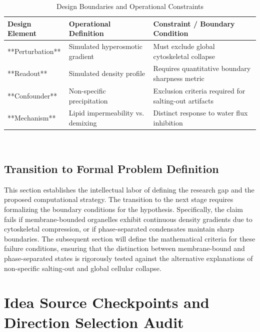 \documentclass[conference]{IEEEtran}
\begin{document}
\begin{table}[htbp]
\centering
\footnotesize
\setlength{\tabcolsep}{3pt}
\renewcommand{\arraystretch}{1.12}
\caption{Design Boundaries and Operational Constraints}
\label{tab:research-questions-and-contributions-rqc-3}
\begin{tabular}{|p{}|p{}|p{}|}
\hline
Design Element & Operational Definition & Constraint / Boundary Condition \\\hline
**Perturbation** & Simulated hyperosmotic gradient & Must exclude global cytoskeletal collapse \\\hline
**Readout** & Simulated density profile & Requires quantitative boundary sharpness metric \\\hline
**Confounder** & Non-specific precipitation & Exclusion criteria required for salting-out artifacts \\\hline
**Mechanism** & Lipid impermeability vs. demixing & Distinct response to water flux inhibition \\\hline
\end{tabular}
\end{table}~\cite{cite_9ae4c49700eea560}

\subsection{Transition to Formal Problem Definition}
This section establishes the intellectual labor of defining the research gap and the proposed computational strategy. The transition to the next stage requires formalizing the boundary conditions for the hypothesis. Specifically, the claim fails if membrane-bounded organelles exhibit continuous density gradients due to cytoskeletal compression, or if phase-separated condensates maintain sharp boundaries. The subsequent section will define the mathematical criteria for these failure conditions, ensuring that the distinction between membrane-bound and phase-separated states is rigorously tested against the alternative explanations of non-specific salting-out and global cellular collapse.

\section{Idea Source Checkpoints and Direction Selection Audit}
\end{document}
